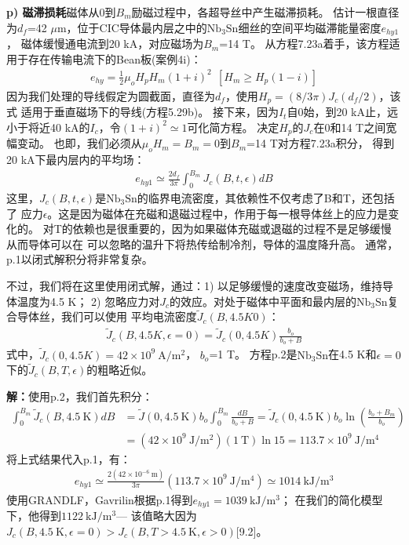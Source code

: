 \textbf{p) 磁滞损耗}\qquad 磁体从0到$B_m$励磁过程中，各超导丝中产生磁滞损耗。
估计一根直径为$d_f$=42 $\mu$m，位于CIC导体最内层之中的$\mathrm{Nb_3Sn}$细丝的空间平均磁滞能量密度$e_{hy1}$，
磁体缓慢通电流到20 kA，对应磁场为$B_m$=14 T。
从方程7.23a着手，该方程适用于存在传输电流下的Bean板(案例4i)：
\begin{align*}%
e_{hy}=\frac{1}{2}\mu_oH_pH_m(1+i)^2\     \ [H_m\geq H_p(1-i)] \tag{7.23a}
\end{align*}
因为我们处理的导线假定为圆截面，直径为$d_f$，使用$H_p=(8/3\pi)J_c(d_f/2)$，该式
适用于垂直磁场下的导线(方程5.29b)。
接下来，因为$I_t$自0始，到20 kA止，远小于将近40 kA的$I_c$，令$(1+i)^2\simeq 1$可化简方程。
决定$H_p$的$J_c$在0和14 T之间宽幅变动。
也即，我们必须从$\mu_o H_m=B_m=0$到$B_m$=14 T对方程7.23a积分，
得到20 kA下最内层内的平均场：
\begin{align*}%
e_{hy1}\simeq\frac{2d_f}{3\pi}\int_{0}^{B_m}J_c(B,t,\epsilon)dB \tag{p.1}
\end{align*}
这里，$J_c(B,t,\epsilon)$是$\mathrm{Nb_3Sn}$的临界电流密度，其依赖性不仅考虑了B和T，还包括了
应力$\epsilon$。这是因为磁体在充磁和退磁过程中，作用于每一根导体丝上的应力是变化的。
对T的依赖也是很重要的，因为如果磁体充磁或退磁的过程不是足够缓慢从而导体可以在
可以忽略的温升下将热传给制冷剂，导体的温度降升高。
通常，p.1以闭式解积分将非常复杂。

不过，我们将在这里使用闭式解，通过：1) 以足够缓慢的速度改变磁场，维持导体温度为4.5 K；
2) 忽略应力对$J_c$的效应。对处于磁体中平面和最内层的$\mathrm{Nb_3Sn}$复合导体丝，我们可以使用
平均电流密度$\tilde{J}_c(B,4.5K0)$：
\begin{align*}%
\tilde{J}_c(B,4.5K,\epsilon=0)=\tilde{J}_c(0,4.5K)\frac{b_o}{b_o+B} \tag{p.2}
\end{align*}
式中，$\tilde{J}_c(0,4.5K)=42\times 10^9\ \mathrm{ A/m^2}$，
$b_o$=1 T。
方程p.2是$\mathrm{Nb_3Sn}$在4.5 K和$\epsilon=0$下的$\tilde{J}_c(B,T,\epsilon)$的粗略近似。

\textbf{解：}使用p.2，我们首先积分：
\begin{align*}%
\int_{0}^{B_m}\tilde{J}_c(B,4.5\ \mathrm{K})dB&=\tilde{J}(0,4.5\ \mathrm{K})b_o\int_{0}^{B_m}\frac{dB}{b_o+B}=\tilde{J}_c(0,4.5\ \mathrm{K})b_o\ln(\frac{b_o+B_m}{b_o})\\
&=(42\times10^9\ \mathrm{J/m^2})(1\ \mathrm{T})\ln15=113.7\times10^9\ \mathrm{J/m^4}
\end{align*}
将上式结果代入p.1，有：
\begin{align*}%
e_{hy1}\simeq\frac{2(42\times10^{-6}\ \mathrm{m})}{3\pi}(113.7\times10^9\ \mathrm{J/m^4})\simeq1014\ \mathrm{kJ/m^3}
\end{align*}
使用GRANDLF，Gavrilin根据p.1得到$e_{hy1}=1039\ \mathrm{kJ/m^3}$；
在我们的简化模型下，他得到$1122\ \mathrm{kJ/m^3}$---
该值略大因为$J_c(B,4.5\ \mathrm{K},\epsilon=0)>J_c(B,T>4.5\ \mathrm{K},\epsilon>0)$[9.2]。

